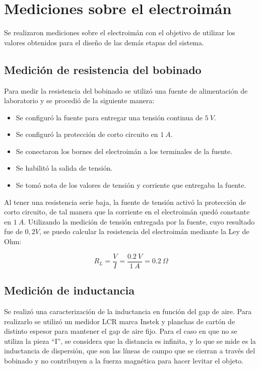 \section{Mediciones sobre el electroimán}

\noindent Se realizaron mediciones sobre el electroimán con el objetivo de utilizar los valores obtenidos para el diseño de las demás etapas del sistema.

\subsection{Medición de resistencia del bobinado}

\noindent Para medir la resistencia del bobinado se utilizó una fuente de alimentación de laboratorio y se procedió de la siguiente manera:

\begin{itemize}
	\item Se configuró la fuente para entregar una tensión continua de $5\:V$.
	\item Se configuró la protección de corto circuito en $1\:A$.
	\item Se conectaron los bornes del electroimán a los terminales de la fuente.
	\item Se habilitó la salida de tensión.
	\item Se tomó nota de los valores de tensión y corriente que entregaba la fuente.
\end{itemize}

\noindent Al tener una resistencia serie baja, la fuente de tensión activó la protección de corto circuito, de tal manera que la corriente en el electroimán quedó constante en $1\:A$. Utilizando la medición de tensión entregada por la fuente, cuyo resultado fue de $0,2 V$, se puedo calcular la resistencia del electroimán mediante la Ley de Ohm:

\begin{equation}
	R_{L}=\frac{V}{I}=\frac{0.2\:V}{1\:A}=0.2\:\Omega
\end{equation}

\subsection{Medición de inductancia}

\noindent Se realizó una caracterización de la inductancia en función del gap de aire. Para realizarlo se utilizó un medidor LCR marca Instek y planchas de cartón de distinto espesor para mantener el gap de aire fijo. Para el caso en que no se utiliza la pieza ``I'', se considera que la distancia es infinita, y lo que se mide es la inductancia de dispersión, que son las líneas de campo que se cierran a través del bobinado y no contribuyen a la fuerza magnética para hacer levitar el objeto.

